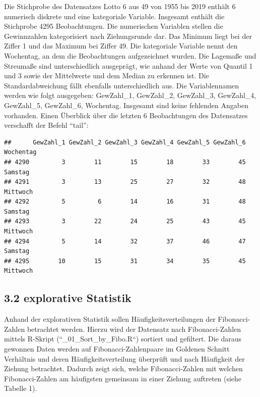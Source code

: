 \documentclass[ngerman,]{article}
\begin{document}
Die Stichprobe des Datensatzes Lotto 6 aus 49 von 1955 bis 2019 enthält
6 numerisch diskrete und eine kategoriale Variable. Insgesamt enthält
die Stichprobe 4295 Beobachtungen. Die numerischen Variablen stellen die
Gewinnzahlen kategorisiert nach Ziehungsrunde dar. Das Minimum liegt bei
der Ziffer 1 und das Maximum bei Ziffer 49. Die kategoriale Variable
nennt den Wochentag, an dem die Beobachtungen aufgezeichnet wurden. Die
Lagemaße und Streumaße sind unterschiedlich ausgeprägt, wie anhand der
Werte von Quantil 1 und 3 sowie der Mittelwerte und dem Median zu
erkennen ist. Die Standardabweichung fällt ebenfalls unterschiedlich
aus. Die Variablennamen werden wie folgt ausgegeben: GewZahl\_1,
GewZahl\_2, GewZahl\_3, GewZahl\_4, GewZahl\_5, GewZahl\_6, Wochentag.
Insgesamt sind keine fehlenden Angaben vorhanden. Einen Überblick über
die letzten 6 Beobachtungen des Datensatzes verschafft der Befehl
``tail'':

\begin{verbatim}
##      GewZahl_1 GewZahl_2 GewZahl_3 GewZahl_4 GewZahl_5 GewZahl_6 Wochentag
## 4290         3        11        15        18        33        45   Samstag
## 4291         3        13        25        27        32        48  Mittwoch
## 4292         5         6        14        16        31        48   Samstag
## 4293         3        22        24        25        43        45  Mittwoch
## 4294         5        14        32        37        46        47   Samstag
## 4295        10        15        31        34        35        45  Mittwoch
\end{verbatim}

\subsection{3.2 explorative Statistik}\label{explorative-statistik}

Anhand der explorativen Statistik sollen Häufigkeitsverteilungen der
Fibonacci-Zahlen betrachtet werden. Hierzu wird der Datensatz nach
Fibonacci-Zahlen mittels R-Skript (``\_01\_Sort\_by\_Fibo.R``) sortiert
und gefiltert. Die daraus gewonnen Daten werden auf
Fibonacci-Zahlenpaare im Goldenen Schnitt Verhältnis und deren
Häufigkeitsverteilung überprüft und nach Häufigkeit der Ziehung
betrachtet. Dadurch zeigt sich, welche Fibonacci-Zahlen mit welchen
Fibonacci-Zahlen am häufigsten gemeinsam in einer Ziehung auftreten
(siehe Tabelle 1).
\end{document}
